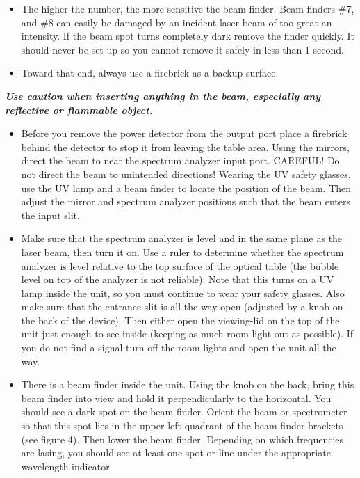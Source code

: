 \documentclass{../lab}
\begin{document}
\begin{itemize}
    \item The higher the number, the more sensitive the beam finder. Beam finders \#7, and \#8 can easily be damaged by an incident laser beam of too great an intensity. If the beam spot turns completely dark remove the finder quickly. It should never be set up so you cannot remove it safely in less than 1 second.
\end{itemize}

\begin{itemize}
    \item Toward that end, always use a firebrick as a backup surface.
\end{itemize}

\emph{\textbf{Use caution when inserting anything in the beam, especially any reflective or flammable object.}}

\begin{itemize}
    \item Before you remove the power detector from the output port place a firebrick behind the detector to stop it from leaving the table area. Using the mirrors, direct the beam to near the spectrum analyzer input port. CAREFUL! Do not direct the beam to unintended directions! Wearing the UV safety glasses, use the UV lamp and a beam finder to locate the position of the beam. Then adjust the mirror and spectrum analyzer positions such that the beam enters the input slit.
    \item Make sure that the spectrum analyzer is level and in the same plane as the laser beam, then turn it on. Use a ruler to determine whether the spectrum analyzer is level relative to the top surface of the optical table (the bubble level on top of the analyzer is not reliable). Note that this turns on a UV lamp inside the unit, so you must continue to wear your safety glasses. Also make sure that the entrance slit is all the way open (adjusted by a knob on the back of the device). Then either open the viewing-lid on the top of the unit just enough to see inside (keeping as much room light out as possible). If you do not find a signal turn off the room lights and open the unit all the way.
    \item There is a beam finder inside the unit. Using the knob on the back, bring this beam finder into view and hold it perpendicularly to the horizontal. You should see a dark spot on the beam finder. Orient the beam or spectrometer so that this spot lies in the upper left quadrant of the beam finder brackets (see figure 4). Then lower the beam finder. Depending on which frequencies are lasing, you should see at least one spot or line under the appropriate wavelength indicator.
\end{itemize}
\end{document}
